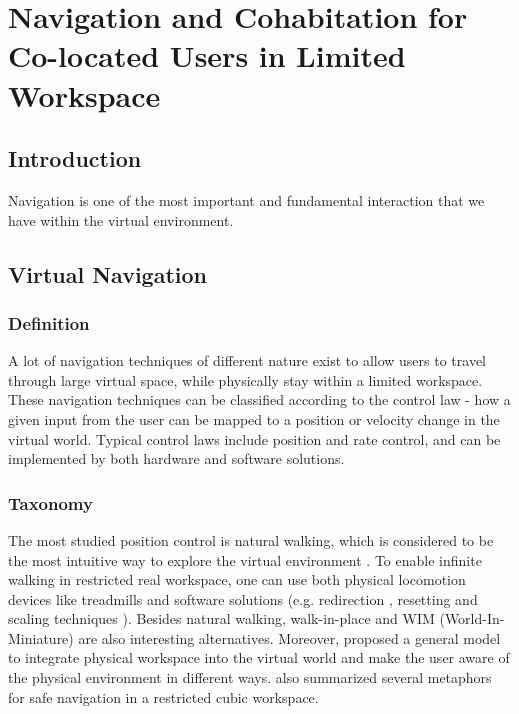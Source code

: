 \chapter{Navigation and Cohabitation for Co-located Users in Limited Workspace}
\label{chapter:navigation}
\minitoc

\section{Introduction}
Navigation is one of the most important and fundamental interaction that we have within the virtual environment.

\section{Virtual Navigation}

\subsection{Definition}
A lot of navigation techniques of different nature exist to allow users to travel through large virtual space, while physically stay within a limited workspace. These navigation techniques can be classified according to the control law - how a given input from the user can be mapped to a position or velocity change in the virtual world. Typical control laws include position and rate control, and can be implemented by both hardware and software solutions.

\subsection{Taxonomy}
The most studied position control is natural walking, which is considered to be the most intuitive way to explore the virtual environment \citep{Ruddle2009BW}. To enable infinite walking in restricted real workspace, one can use both physical locomotion devices like treadmills \citep{Iwata1999Treadmill} and software solutions (e.g. redirection \citep{Peck2008RED}, resetting \citep{Williams2007ELV} and scaling techniques \cite{Interrante2007SLB}). Besides natural walking, walk-in-place \citep{Razzaque2002RWP} and WIM (World-In-Miniature) \citep{Stoakley1995VRW} are also interesting alternatives. Moreover, \citet{Fleury2010Generic} proposed a general model to integrate physical workspace into the virtual world and make the user aware of the physical environment in different ways. \citet{Cirio2012Cube} also summarized several metaphors for safe navigation in a restricted cubic workspace.

